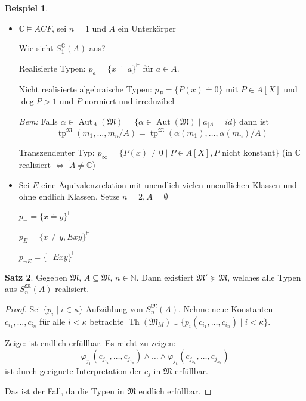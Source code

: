 \documentclass[12pt,parskip=full]{scrartcl}
\newcommand{\setN}{\mathbb{N}}
\newcommand{\setC}{\mathbb{C}}
\theoremstyle{definition}
\newtheorem{theorem}{Satz}[section]
\newtheorem{example}[theorem]{Beispiel}
\begin{document}
 	\begin{example}
 		\begin{itemize}
 			\item $\setC \models ACF$, sei $n = 1$ und $A$ ein Unterkörper
 	
 			Wie sieht $S_1^\setC(A)$ aus?
 			
 			Realisierte Typen: $p_a = \{ x \doteq a \}^\vdash$ für $a \in A$.
 			
 			Nicht realisierte algebraische Typen: $p_P = \{ P(x) \doteq 0 \}$ mit $P \in A[X]$ und $\deg P > 1$ und $P$ normiert und irreduzibel
 			
 			\textit{Bem:} Falls $\alpha \in \operatorname{Aut}_A(\mathfrak{M}) = \{ \alpha \in \operatorname{Aut}(\mathfrak{M}) \mid a_{\mid A} = id \}$ dann ist
 			\begin{equation*}
	 			\operatorname{tp}^\mathfrak{M}(m_1, \dots, m_n / A) = \operatorname{tp}^\mathfrak{M}(\alpha(m_1), \dots, \alpha(m_n) / A)
 			\end{equation*}
 			
 			Transzendenter Typ: $p_\infty = \{ P(x) \neq 0 \mid P \in A[X], \text{$P$ nicht konstant} \}$ (in $\setC$ realisiert $\Leftrightarrow$ $\tilde{A} \neq \setC$)
 			
 			\item Sei $E$ eine Äquivalenzrelation mit unendlich vielen unendlichen Klassen und ohne endlich Klassen. Setze $n = 2, A = \emptyset$
 			
 			$p_= = \{ x \doteq y \}^\vdash$
 			
 			$p_E = \{ x \neq y, E x y \}^\vdash$
 			
 			$p_{\lnot E} = \{ \lnot E x y \}^\vdash$
 		\end{itemize}
 	\end{example}
 
 	\begin{theorem}
 		Gegeben $\mathfrak{M}$, $A \subseteq \mathfrak{M}$, $n \in \setN$. Dann existiert $\mathfrak{M}' \succcurlyeq \mathfrak{M}$, welches alle Typen aus $S_n^\mathfrak{M}(A)$ realisiert.
 	\end{theorem}
 
 	\begin{proof}
 		Sei $\{ p_i \mid i \in \kappa \}$ Aufzählung von $S_n^\mathfrak{M}(A)$. Nehme neue Konstanten $c_{i_1}, \dots, c_{i_n}$ für alle $i < \kappa$ betrachte $\operatorname{Th}(\mathfrak{M}_M) \cup \{ p_i(c_{i_1}, \dots, c_{i_n}) \mid i < \kappa \}$.
 		
 		Zeige: ist endlich erfüllbar. Es reicht zu zeigen:
 		\begin{equation*}
	 		\varphi_{j_1}(c_{j_{1_1}}, \dots, c_{j_{1_n}}) \land \dots \land \varphi_{j_k}(c_{j_{k_1}}, \dots, c_{j_{k_n}})
 		\end{equation*}
 		ist durch geeignete Interpretation der $c_j$ in $\mathfrak{M}$ erfüllbar.
 		
 		Das ist der Fall, da die Typen in $\mathfrak{M}$ endlich erfüllbar.
 	\end{proof}
 
\end{document}
